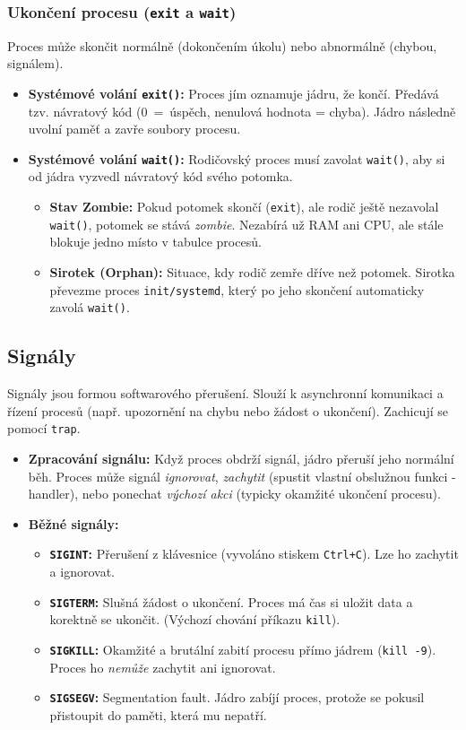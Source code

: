 \subsubsection*{Ukončení procesu (\texttt{exit} a \texttt{wait})}
Proces může skončit normálně (dokončením úkolu) nebo abnormálně (chybou, signálem).
\begin{itemize}
    \item \textbf{Systémové volání \texttt{exit()}:} Proces jím oznamuje jádru, že končí. Předává tzv. návratový kód (0~=~úspěch, nenulová hodnota = chyba). Jádro následně uvolní paměť a zavře soubory procesu.
    \item \textbf{Systémové volání \texttt{wait()}:} Rodičovský proces musí zavolat \texttt{wait()}, aby si od jádra vyzvedl návratový kód svého potomka.
    \begin{itemize}
        \item \textbf{Stav Zombie:} Pokud potomek skončí (\texttt{exit}), ale rodič ještě nezavolal \texttt{wait()}, potomek se stává \textit{zombie}. Nezabírá už RAM ani CPU, ale stále blokuje jedno místo v tabulce procesů.
        \item \textbf{Sirotek (Orphan):} Situace, kdy rodič zemře dříve než potomek. Sirotka převezme proces \texttt{init/systemd}, který po jeho skončení automaticky zavolá \texttt{wait()}.
    \end{itemize}    
\end{itemize}

\subsection{Signály}
Signály jsou formou softwarového přerušení. Slouží k asynchronní komunikaci a řízení procesů (např. upozornění na chybu nebo žádost o ukončení).
Zachicují se pomocí \texttt{trap}.
\begin{itemize}
    \item \textbf{Zpracování signálu:} Když proces obdrží signál, jádro přeruší jeho normální běh. Proces může signál \textit{ignorovat}, \textit{zachytit} (spustit vlastní obslužnou funkci - handler), nebo ponechat \textit{výchozí akci} (typicky okamžité ukončení procesu).
    \item \textbf{Běžné signály:}
    \begin{itemize}
        \item \textbf{\texttt{SIGINT}:} Přerušení z klávesnice (vyvoláno stiskem \texttt{Ctrl+C}). Lze ho zachytit a ignorovat.
        \item \textbf{\texttt{SIGTERM}:} Slušná žádost o ukončení. Proces má čas si uložit data a korektně se ukončit. (Výchozí chování příkazu \texttt{kill}).
        \item \textbf{\texttt{SIGKILL}:} Okamžité a brutální zabití procesu přímo jádrem (\texttt{kill -9}). Proces ho \textit{nemůže} zachytit ani ignorovat.
        \item \textbf{\texttt{SIGSEGV}:} Segmentation fault. Jádro zabíjí proces, protože se pokusil přistoupit do paměti, která mu nepatří.
    \end{itemize}
\end{itemize}

